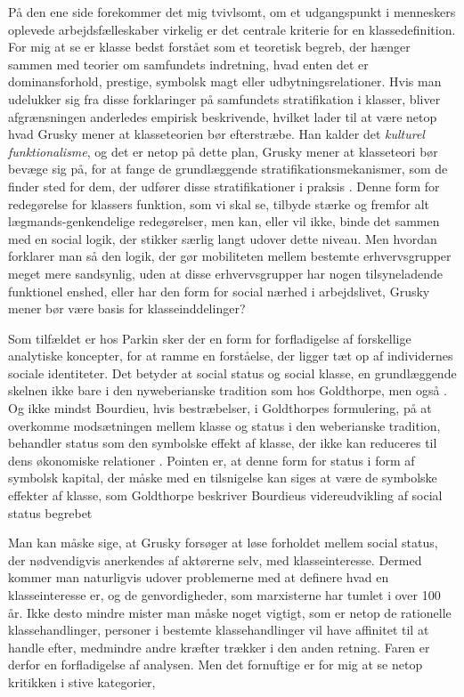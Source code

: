 På den ene side forekommer det mig tvivlsomt, om et udgangspunkt i menneskers oplevede arbejdsfælleskaber virkelig er det centrale kriterie for en klassedefinition. For mig at se er klasse bedst forstået som et teoretisk begreb, der hænger sammen med teorier om samfundets indretning, hvad enten det er dominansforhold, prestige, symbolsk magt eller udbytningsrelationer. Hvis man udelukker sig fra disse forklaringer på samfundets stratifikation i klasser, bliver afgrænsningen anderledes empirisk beskrivende, hvilket lader til at være netop hvad Grusky mener at klasseteorien bør efterstræbe. Han kalder det \emph{kulturel funktionalisme}, og det er netop på dette plan, Grusky mener at klasseteori bør bevæge sig på, for at fange de grundlæggende stratifikationsmekanismer, som de finder sted for dem, der udfører disse stratifikationer i praksis \parencite[229]{Grusky2002}. Denne form for redegørelse for klassers funktion, som vi skal se, tilbyde stærke og fremfor alt lægmands-genkendelige redegørelser, men kan, eller vil ikke, binde det sammen med en social logik, der stikker særlig langt udover dette niveau. Men hvordan forklarer man så den logik, der gør mobiliteten mellem bestemte erhvervsgrupper meget mere sandsynlig, uden at disse erhvervsgrupper har nogen tilsyneladende funktionel enshed, eller har den form for social nærhed i arbejdslivet, Grusky mener bør være basis for klasseinddelinger? 

Som tilfældet er hos Parkin sker der en form for forfladigelse af forskellige analytiske koncepter, for at ramme en forståelse, der ligger tæt op af individernes sociale identiteter. Det betyder at social status og social klasse, en grundlæggende skelnen ikke bare i den nyweberianske tradition som hos Goldthorpe, men også \textcite{Scott2002}. Og ikke mindst Bourdieu, hvis bestræbelser, i Goldthorpes formulering, på at overkomme modsætningen mellem klasse og status i den weberianske tradition, behandler status som den symbolske effekt af klasse, der ikke kan reduceres til dens økonomiske relationer \parencite[513]{Goldthorpe2007b}. Pointen er, at denne form for status i form af symbolsk kapital, der måske med en tilsnigelse kan siges at være de symbolske effekter af klasse, som Goldthorpe beskriver Bourdieus videreudvikling af social status begrebet \parencite[Goldthorpe2007b]{513}

Man kan måske sige, at Grusky forsøger at løse forholdet mellem social status, der nødvendigvis anerkendes af aktørerne selv, med klasseinteresse. Dermed kommer man naturligvis udover problemerne med at definere hvad en klasseinteresse er, og de genvordigheder, som marxisterne har tumlet i over 100 år. Ikke desto mindre mister man måske noget vigtigt, som er netop de rationelle klassehandlinger, personer i bestemte klassehandlinger vil have affinitet til at handle efter, medmindre andre kræfter trækker i den anden retning. Faren er derfor en forfladigelse af analysen. Men det fornuftige er for mig at se netop kritikken i stive kategorier,

